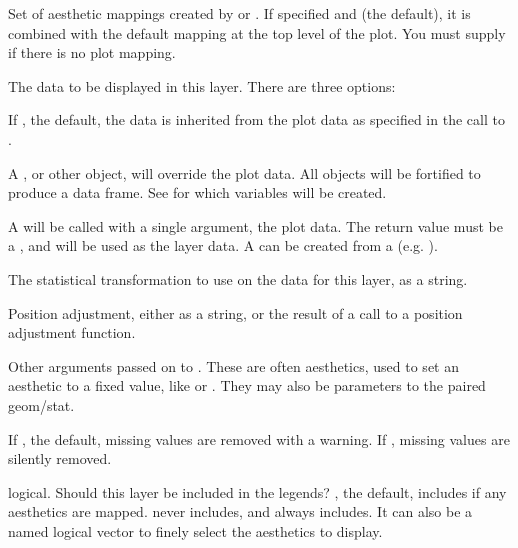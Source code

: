 \documentclass[a4paper]{book}
\begin{document}
\begin{Arguments}
\begin{ldescription}
\item[\code{mapping}] Set of aesthetic mappings created by  or
. If specified and  (the
default), it is combined with the default mapping at the top level of the
plot. You must supply  if there is no plot mapping.

\item[\code{data}] The data to be displayed in this layer. There are three
options:

If , the default, the data is inherited from the plot
data as specified in the call to .

A , or other object, will override the plot
data. All objects will be fortified to produce a data frame. See
 for which variables will be created.

A  will be called with a single argument,
the plot data. The return value must be a , and
will be used as the layer data. A  can be created
from a  (e.g. ).

\item[\code{stat}] The statistical transformation to use on the data for this
layer, as a string.

\item[\code{position}] Position adjustment, either as a string, or the result of
a call to a position adjustment function.

\item[\code{...}] Other arguments passed on to . These are
often aesthetics, used to set an aesthetic to a fixed value, like
 or . They may also be parameters
to the paired geom/stat.

\item[\code{na.rm}] If , the default, missing values are removed with
a warning. If , missing values are silently removed.

\item[\code{show.legend}] logical. Should this layer be included in the legends?
, the default, includes if any aesthetics are mapped.
 never includes, and  always includes.
It can also be a named logical vector to finely select the aesthetics to
display.


\end{ldescription}
\end{Arguments}
\end{document}
